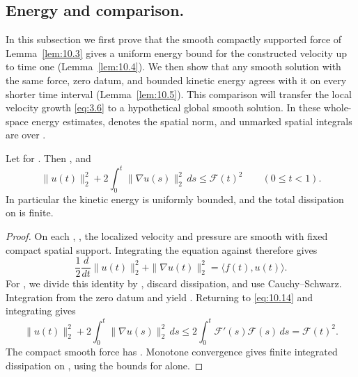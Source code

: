 %
\subsection{Energy and comparison.}\label{sec:10.3}
In this subsection we first prove that the smooth compactly supported force
 of Lemma~\ref{lem:10.3} gives a uniform energy bound for the
constructed velocity  up to time one (Lemma~\ref{lem:10.4}).
We then show that any smooth solution with the same force, zero datum, and bounded kinetic
energy agrees with it on every shorter time interval (Lemma~\ref{lem:10.5}). This comparison
will transfer the local velocity growth \eqref{eq:3.6} to a hypothetical global smooth
solution. In these whole-space energy estimates, 
denotes the spatial  norm, and unmarked spatial integrals
are over .

\begin{lemma}\label{lem:10.4}
Let  for
. Then
, and
\begin{equation}
  \|u(t)\|_2^2+2\int_0^t\|\nabla u(s)\|_2^2\,ds
  \leq \mathcal F(t)^2
  \qquad (0\leq t<1).
\tag{10.13}\label{eq:10.13}
\end{equation}
In particular the kinetic energy is uniformly bounded, and the total dissipation on
\NSi{NS-F-P121-010}{[0,1)} is finite.
\end{lemma}

\begin{proof}
On each , , the localized velocity
and pressure are smooth with fixed compact spatial support. Integrating the equation against
 therefore gives
\begin{equation}
  \frac12\frac{d}{dt}\|u(t)\|_2^2+\|\nabla u(t)\|_2^2
  =\langle f(t),u(t)\rangle.
\tag{10.14}\label{eq:10.14}
\end{equation}
For , we divide this identity by
, discard dissipation, and use
Cauchy--Schwarz. Integration from the zero datum and
 yield
. Returning to
\eqref{eq:10.14} and integrating gives
\[
  \|u(t)\|_2^2+2\int_0^t\|\nabla u(s)\|_2^2\,ds
  \leq 2\int_0^t\mathcal F'(s)\mathcal F(s)\,ds
  =\mathcal F(t)^2.
\]
The compact smooth force has . Monotone
convergence gives finite integrated dissipation on \NSi{NS-F-P121-021}{[0,1)}, using
the bounds for  alone.
\end{proof}

